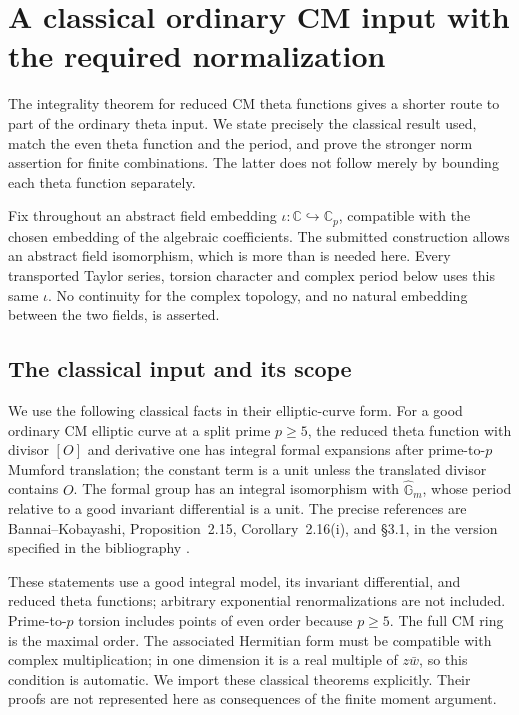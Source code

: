 \section{A classical ordinary CM input with the required normalization}
\label{ct-section}

The integrality theorem for reduced CM theta functions gives a shorter
route to part of the ordinary theta input.  We state precisely the
classical result used, match the even theta function and the period,
and prove the stronger norm assertion for finite combinations.  The
latter does not follow merely by bounding each theta function
separately.

Fix throughout an abstract field embedding $\iota:\mathbb C\hookrightarrow
\mathbb C_p$, compatible with the chosen embedding of the algebraic
coefficients.  The submitted construction allows an abstract field
isomorphism, which is more than is needed here.  Every transported
Taylor series, torsion character and complex period below uses this
same $\iota$.  No continuity for the complex topology, and no natural
embedding between the two fields, is asserted.

\subsection{The classical input and its scope}

We use the following classical facts in their elliptic-curve form.
For a good ordinary CM elliptic curve at a split prime $p\ge5$,
the reduced theta function with divisor $[O]$ and derivative one
has integral formal expansions after prime-to-$p$ Mumford translation;
the constant term is a unit unless the translated divisor contains
$O$.  The formal group has an integral isomorphism with
$\widehat{\mathbb G}_m$, whose period relative to a good invariant
differential is a unit.  The precise references are
Bannai--Kobayashi, Proposition~2.15, Corollary~2.16(i), and
\S3.1, in the version specified in the bibliography
\cite{bannai-kobayashi-2007}.

These statements use a good integral model, its invariant
differential, and reduced theta functions; arbitrary exponential
renormalizations are not included.  Prime-to-$p$ torsion includes
points of even order because $p\ge5$.  The full CM ring is the
maximal order.  The associated Hermitian form must be compatible
with complex multiplication; in one dimension it is a real
multiple of $z\bar w$, so this condition is automatic.
We import these classical theorems explicitly.  Their proofs are
not represented here as consequences of the finite moment argument.

